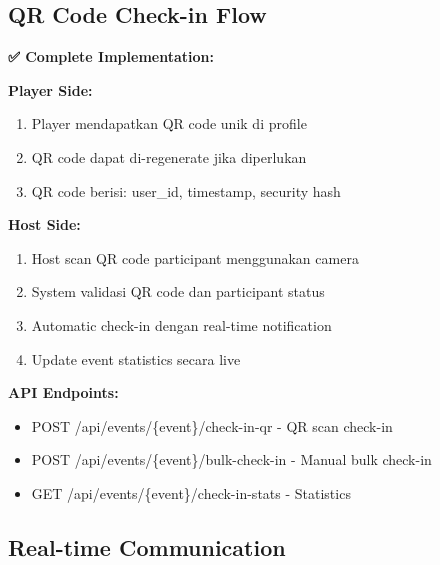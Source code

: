 \documentclass[12pt,a4paper]{article}
\begin{document}
\subsection{QR Code Check-in Flow}

\begin{implemented}
\textbf{✅ Complete Implementation:}

\textbf{Player Side:}
\begin{enumerate}
    \item Player mendapatkan QR code unik di profile
    \item QR code dapat di-regenerate jika diperlukan
    \item QR code berisi: user\_id, timestamp, security hash
\end{enumerate}

\textbf{Host Side:}
\begin{enumerate}
    \item Host scan QR code participant menggunakan camera
    \item System validasi QR code dan participant status
    \item Automatic check-in dengan real-time notification
    \item Update event statistics secara live
\end{enumerate}

\textbf{API Endpoints:}
\begin{itemize}
    \item POST /api/events/\{event\}/check-in-qr - QR scan check-in
    \item POST /api/events/\{event\}/bulk-check-in - Manual bulk check-in
    \item GET /api/events/\{event\}/check-in-stats - Statistics
\end{itemize}
\end{implemented}

\subsection{Real-time Communication}
\end{document}
